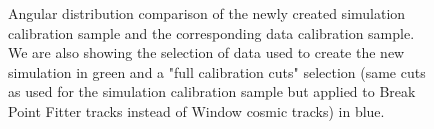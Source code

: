 \begin{figure}[!ht]

\caption{Angular distribution comparison of the newly created simulation calibration sample and the corresponding data calibration sample. We are also showing the selection of data used to create the new simulation in green and a "full calibration cuts" selection (same cuts as used for the simulation calibration sample but applied to Break Point Fitter tracks instead of Window cosmic tracks) in blue.}
\label{figDataMCComparison_cosXcosY}
\end{figure}

